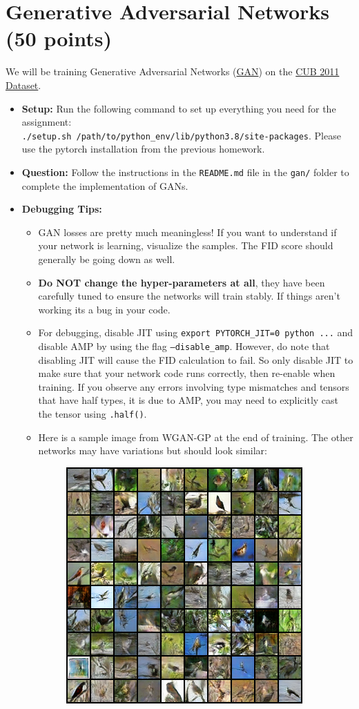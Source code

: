 \documentclass[11pt,addpoints,answers]{exam}
\numberwithin{equation}{section} %
\numberwithin{figure}{section} %
\numberwithin{table}{section} %
\begin{document}
\section{Generative Adversarial Networks (50 points)}
We will be training Generative Adversarial Networks (\href{(https://arxiv.org/pdf/1406.2661.pdf)}{GAN}) on the \href{http://www.vision.caltech.edu/visipedia/CUB-200-2011.html}{CUB 2011 Dataset}. 
\begin{itemize}
    \item \textbf{Setup:} Run the following command to set up everything you need for the assignment: \\ \texttt{./setup.sh /path/to/python\_env/lib/python3.8/site-packages}. Please use the pytorch installation from the previous homework.
\item \textbf{Question:} Follow the instructions in the \texttt{README.md} file in the \texttt{gan/} folder to complete the implementation of GANs.
\item \textbf{Debugging Tips:}
    \begin{itemize}
        \item GAN losses are pretty much meaningless! If you want to understand if your network is learning, visualize the samples. The FID score should generally be going down as well.
        \item \textbf{Do NOT change the hyper-parameters at all}, they have been carefully tuned to ensure the networks will train stably. If things aren't working its a bug in your code.
        \item For debugging, disable JIT using \texttt{export PYTORCH\_JIT=0 python ...} and disable AMP by using the flag \texttt{--disable\_amp}. However, do note that disabling JIT will cause the FID calculation to fail. So only disable JIT to make sure that your network code runs correctly, then re-enable when training. If you observe any errors involving type mismatches and tensors that have half types, it is due to AMP, you may need to explicitly cast the tensor using \texttt{.half()}.
        \item 
        \begin{minipage}[t]{\linewidth}
          Here is a sample image from WGAN-GP at the end of training. The other networks may have variations but should look similar: 
          \medskip
          \begin{figure}[H]
          \centering
          \includegraphics[width=.4\linewidth]{examples/samples_30000.png}

\end{figure}
\end{minipage}
\end{itemize}
\end{itemize}
\end{document}
